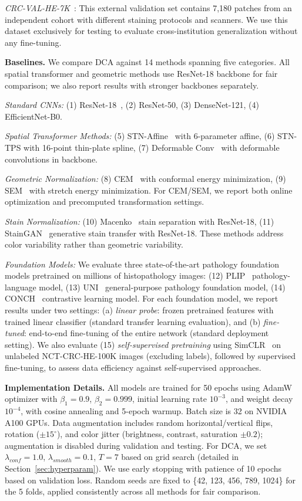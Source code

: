 \documentclass[10pt,journal,compsoc]{IEEEtran}
\begin{document}
\textit{CRC-VAL-HE-7K}~\cite{nct_dataset}: This external validation set contains 7,180 patches from an independent cohort with different staining protocols and scanners. We use this dataset exclusively for testing to evaluate cross-institution generalization without any fine-tuning.

\textbf{Baselines.} We compare DCA against 14 methods spanning five categories. All spatial transformer and geometric methods use ResNet-18 backbone for fair comparison; we also report results with stronger backbones separately.

\textit{Standard CNNs:} (1) ResNet-18~\cite{he2016resnet}, (2) ResNet-50, (3) DenseNet-121, (4) EfficientNet-B0.

\textit{Spatial Transformer Methods:} (5) STN-Affine~\cite{jaderberg2015spatial} with 6-parameter affine, (6) STN-TPS with 16-point thin-plate spline, (7) Deformable Conv~\cite{dai2017deformable} with deformable convolutions in backbone.

\textit{Geometric Normalization:} (8) CEM~\cite{huang2024surface} with conformal energy minimization, (9) SEM~\cite{huang2024surface} with stretch energy minimization. For CEM/SEM, we report both online optimization and precomputed transformation settings.

\textit{Stain Normalization:} (10) Macenko~\cite{macenko2009method} stain separation with ResNet-18, (11) StainGAN~\cite{shaban2019staingan} generative stain transfer with ResNet-18. These methods address color variability rather than geometric variability.

\textit{Foundation Models:} We evaluate three state-of-the-art pathology foundation models pretrained on millions of histopathology images: (12) PLIP~\cite{huang2023plip} pathology-language model, (13) UNI~\cite{chen2024uni} general-purpose pathology foundation model, (14) CONCH~\cite{lu2024conch} contrastive learning model. For each foundation model, we report results under two settings: (a) \textit{linear probe}: frozen pretrained features with trained linear classifier (standard transfer learning evaluation), and (b) \textit{fine-tuned}: end-to-end fine-tuning of the entire network (standard deployment setting). We also evaluate (15) \textit{self-supervised pretraining} using SimCLR~\cite{chen2020simple} on unlabeled NCT-CRC-HE-100K images (excluding labels), followed by supervised fine-tuning, to assess data efficiency against self-supervised approaches.

\textbf{Implementation Details.} All models are trained for 50 epochs using AdamW optimizer with $\beta_1=0.9$, $\beta_2=0.999$, initial learning rate $10^{-3}$, and weight decay $10^{-4}$, with cosine annealing and 5-epoch warmup. Batch size is 32 on NVIDIA A100 GPUs. Data augmentation includes random horizontal/vertical flips, rotation ($\pm 15^\circ$), and color jitter (brightness, contrast, saturation $\pm 0.2$); augmentation is disabled during validation and testing. For DCA, we set $\lambda_{conf}=1.0$, $\lambda_{smooth}=0.1$, $T=7$ based on grid search (detailed in Section~\ref{sec:hyperparam}). We use early stopping with patience of 10 epochs based on validation loss. Random seeds are fixed to \{42, 123, 456, 789, 1024\} for the 5 folds, applied consistently across all methods for fair comparison. 
\end{document}
